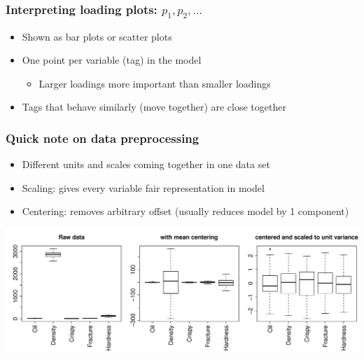 \begin{frame}\frametitle{Interpreting loading plots: \( p_1, p_2, \ldots \)}

\begin{itemize}
	
	\item	Shown as bar plots or scatter plots

	\item 	One point per variable (tag) in the model
	
			\begin{itemize}
				
				\item	Larger loadings more important than smaller loadings
				
			\end{itemize}

	\item 	Tags that behave similarly (move together) are close together 
	
\end{itemize}
\end{frame}

\begin{frame}\frametitle{Quick note on data preprocessing}

\begin{itemize}
	
	\item	Different units and scales coming together in one data set
	
	\item	Scaling: gives every variable fair representation in model
	
	\item	Centering: removes arbitrary offset (usually reduces model by 1 component)
	
\end{itemize}

\begin{center}
	\includegraphics[width=\textwidth]{images/pca-on-food-texture-centering-and-scaling.png}
\end{center}
\end{frame}

